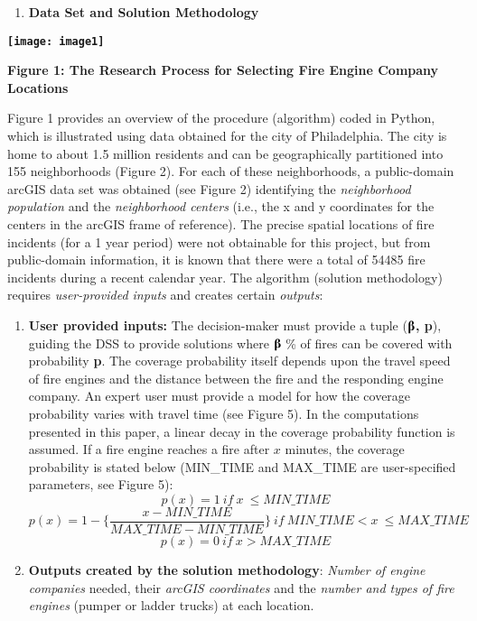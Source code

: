 \documentclass{article} %
\begin{document}
\noindent \textbf{\eject }

\begin{enumerate}
\item \textbf{ Data Set and Solution Methodology}
\end{enumerate}

\noindent \textbf{\texttt{[image: image1]}}

\noindent \textbf{}

\noindent \textbf{Figure 1: The Research Process for Selecting Fire Engine Company Locations}

\noindent \textbf{}

\noindent Figure 1 provides an overview of the procedure (algorithm) coded in Python, which is illustrated using data obtained for the city of Philadelphia.  The city is home to about 1.5 million residents and can be geographically partitioned into 155 neighborhoods (Figure 2).  For each of these neighborhoods, a public-domain arcGIS data set was obtained (see Figure 2) identifying the \textit{neighborhood population} and the \textit{neighborhood centers} (i.e.,  the x and y coordinates for the centers in the arcGIS frame of reference).  The precise spatial locations of fire incidents (for a 1 year period) were not obtainable for this project, but from public-domain information, it is known that there were a total of 54485 fire incidents during a recent calendar year.  The algorithm (solution methodology) requires \textit{user-provided inputs} and creates certain \textit{outputs}:

\begin{enumerate}
\item  \textbf{User provided inputs:}  The decision-maker must provide a tuple (\textbf{$\boldsymbol{\betaup}$, p}), guiding the DSS to provide solutions where \textbf{$\boldsymbol{\betaup}$ }\% of fires can be covered with probability \textbf{p}.  The coverage probability itself depends upon the travel speed of fire engines and the distance between the fire and the responding engine company.  An expert user must provide a model for how the coverage probability varies with travel time (see Figure 5).  In the computations presented in this paper, a linear decay in the coverage probability function is assumed.  If a fire engine reaches a fire after $x$ minutes, the coverage probability is stated below (MIN\_TIME and MAX\_TIME are user-specified parameters, see Figure 5):
\[p\left(x\right)=1\ if\ x\ \le MIN\_TIME\] 
\[p\left(x\right)=1-\{\frac{x-MIN\_TIME}{MAX\_TIME-MIN\_TIME}\}\ if\ MIN\_TIME<x\ \le MAX\_TIME\] 
\[p\left(x\right)=0\ if\ x>MAX\_TIME\] 

\item  \textbf{Outputs created by the solution methodology}:  \textit{Number of engine companies} needed, their \textit{arcGIS coordinates} and the \textit{number and types of fire engines} (pumper or ladder trucks) at each location.
\end{enumerate}
\end{document}
